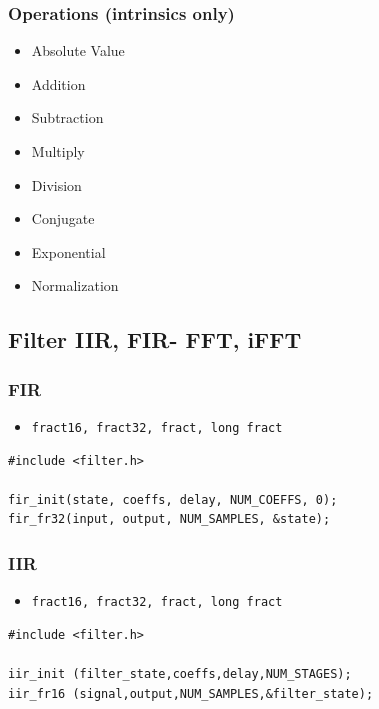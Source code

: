 \subsubsection{Operations (intrinsics only)}
\begin{itemize}
	\item Absolute Value
	\item Addition
	\item Subtraction
	\item Multiply
	\item Division
	\item Conjugate
	\item Exponential
	\item Normalization
\end{itemize}

\subsection{Filter IIR, FIR- FFT, iFFT}
\subsubsection{FIR}
\begin{itemize}
	\item \texttt{fract16, fract32, fract, long fract}
\end{itemize}

\begin{verbatim}
#include <filter.h>

fir_init(state, coeffs, delay, NUM_COEFFS, 0);
fir_fr32(input, output, NUM_SAMPLES, &state);
\end{verbatim}

\subsubsection{IIR}
\begin{itemize}
	\item \texttt{fract16, fract32, fract, long fract}
\end{itemize}

\begin{verbatim}
#include <filter.h>
                  
iir_init (filter_state,coeffs,delay,NUM_STAGES); 
iir_fr16 (signal,output,NUM_SAMPLES,&filter_state);
\end{verbatim}

